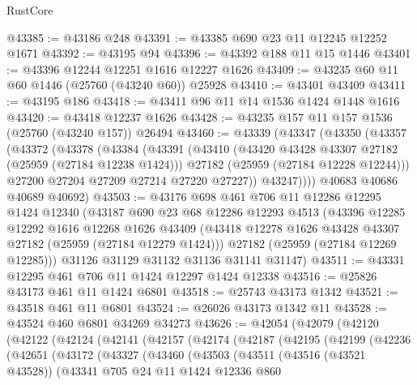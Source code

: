 \begin{lexlean}{RustCore}
\begin{coremodule}
@43385 := @43186 @248
@43391 := @43385 @690 @23 @11 @12245 @12252 @1671
@43392 := @43195 @94
@43396 := @43392 @188 @11 @15 @1446
@43401 := @43396 @12244 @12251 @1616 @12227 @1626
@43409 := @43235 @60 @11 @60 @1446 (@25760 (@43240 @60)) @25928
@43410 := @43401 @43409
@43411 := @43195 @186
@43418 := @43411 @96 @11 @14 @1536 @1424 @1448 @1616
@43420 := @43418 @12237 @1626
@43428 := @43235 @157 @11 @157 @1536 (@25760 (@43240 @157)) @26494
@43460 := @43339
    (@43347
      (@43350
        (@43357
          (@43372
            (@43378
              (@43384
                (@43391
                  (@43410
                    (@43420 @43428 @43307 @27182 (@25959 (@27184 @12238 @1424)))
                    @27182
                    (@25959 (@27184 @12228 @12244)))
                  @27200
                  @27204
                  @27209
                  @27214
                  @27220
                  @27227))
              @43247))))
      @40683
      @40686
      @40689
      @40692)
@43503 := @43176
    @698
    @461
    @706
    @11
    @12286
    @12295
    @1424
    @12340
    (@43187
      @690
      @23
      @68
      @12286
      @12293
      @4513
      (@43396
        @12285
        @12292
        @1616
        @12268
        @1626
        @43409
        (@43418 @12278 @1626 @43428 @43307 @27182 (@25959 (@27184 @12279 @1424)))
        @27182
        (@25959 (@27184 @12269 @12285)))
      @31126
      @31129
      @31132
      @31136
      @31141
      @31147)
@43511 := @43331 @12295 @461 @706 @11 @1424 @12297 @1424 @12338
@43516 := @25826 @43173 @461 @11 @1424 @6801
@43518 := @25743 @43173 @1342
@43521 := @43518 @461 @11 @6801
@43524 := @26026 @43173 @1342 @11
@43528 := @43524 @460 @6801 @34269 @34273
@43626 := @42054
    (@42079
      (@42120
        (@42122
          (@42124
            (@42141
              (@42157
                (@42174
                  (@42187
                    (@42195
                      (@42199
                        (@42236
                          (@42651
                            (@43172
                              (@43327
                                (@43460
                                  (@43503
                                    (@43511
                                      (@43516 (@43521 @43528))
                                      (@43341
                                        @705
                                        @24
                                        @11
                                        @1424
                                        @12336
                                        @860

\end{coremodule}
\end{lexlean}

